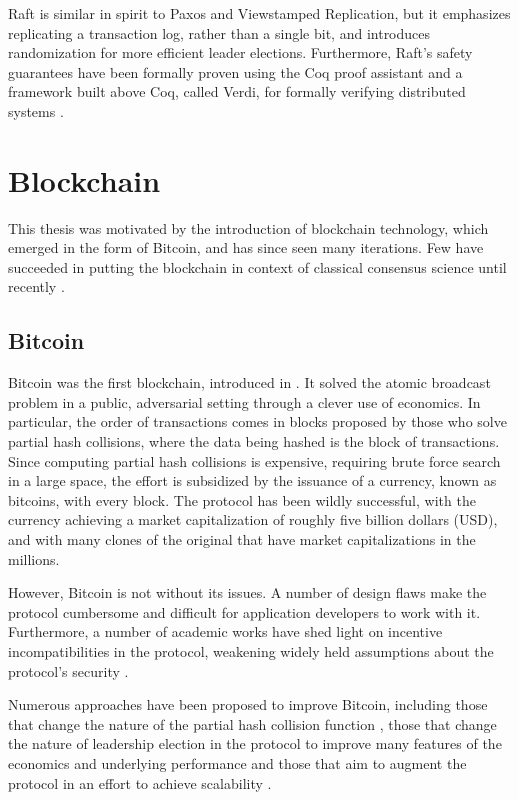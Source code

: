 Raft is similar in spirit to Paxos and Viewstamped Replication, but it emphasizes replicating a transaction log, 
rather than a single bit, and introduces randomization for more efficient leader elections.
Furthermore, Raft's safety guarantees have been formally proven using the Coq proof assistant \cite{woos2016planning}
and a framework built above Coq, called Verdi, for formally verifying distributed systems \cite{wilcox2015verdi}.

\section{Blockchain}

This thesis was motivated by the introduction of blockchain technology, which emerged in the form of Bitcoin,
and has since seen many iterations.
Few have succeeded in putting the blockchain in context of classical consensus science until recently \cite{vukolic11quest,cachin2016non,honeybadger}.

\subsection{Bitcoin} 

Bitcoin was the first blockchain, introduced in \cite{bitcoin}.
It solved the atomic broadcast problem in a public, adversarial setting through a clever use of economics.
In particular, the order of transactions comes in blocks proposed by those who solve partial hash collisions,
where the data being hashed is the block of transactions.
Since computing partial hash collisions is expensive, requiring brute force search in a large space,
the effort is subsidized by the issuance of a currency, known as bitcoins, with every block.
The protocol has been wildly successful, with the currency achieving a market capitalization
of roughly five billion dollars (USD), and with many clones of the original that have market capitalizations in the millions.

However, Bitcoin is not without its issues. A number of design flaws make the protocol cumbersome and difficult 
for application developers to work with it.
Furthermore, a number of academic works have shed light on incentive incompatibilities in the protocol,
weakening widely held assumptions about the protocol's security \cite{eyal2014majority,courtois2014subversive}.

Numerous approaches have been proposed to improve Bitcoin,
including those that change the nature of the partial hash collision function \cite{miller2015nonoutsourceable},
those that change the nature of leadership election in the protocol to improve many features of the economics and underlying performance \cite{eyal2015bitcoin}
and those that aim to augment the protocol in an effort to achieve scalability \cite{sidechains,poon2015bitcoin}.

